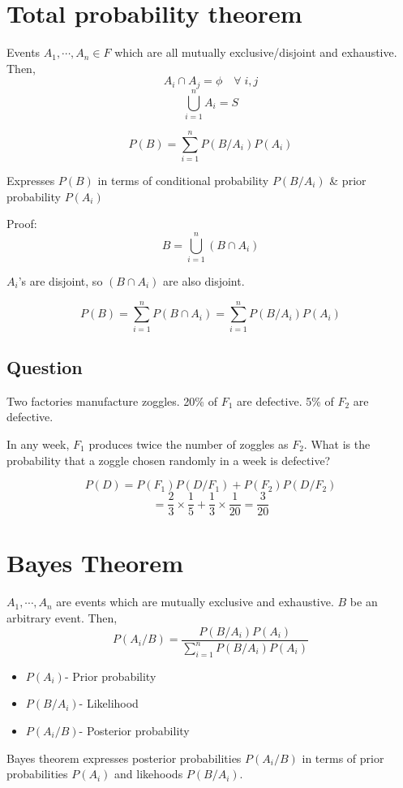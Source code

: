\documentclass{article}
\begin{document}
\section{Total probability theorem}

Events $A_1,\cdots, A_n \in F$ which are all mutually exclusive/disjoint and exhaustive. Then,
$$ A_i \cap A_j = \phi \quad \forall\; i,j$$
$$ \bigcup_{i=1}^{n} A_i =S$$

$$ P(B)= \sum_{i=1}^{n} P(B/A_i)P(A_i)$$

Expresses $ P(B)$  in terms of conditional probability $ P(B/A_i) $ \& prior probability $P(A_i)$

Proof:
$$ B= \bigcup_{i=1}^{n} (B \cap A_i)$$

$A_i$'s are disjoint, so $(B \cap A_i)$ are also disjoint.

$$ P(B)= \sum_{i=1}^{n} P(B \cap A_i)=\sum_{i=1}^{n} P(B / A_i)P(A_i)$$

\subsection{Question}
Two factories manufacture zoggles. 20\% of $F_1$ are defective. 5\% of $F_2$ are defective.

In any week, $F_1$ produces twice the number of zoggles as $F_2$. What is the probability that a zoggle chosen randomly in a week is defective?

$$ P(D)=P(F_1)P(D/F_1)+P(F_2)P(D/F_2)$$
$$ = \frac{2}{3} \times \frac{1}{5} + \frac{1}{3} \times \frac{1}{20} = \frac{3}{20}$$


\section{Bayes Theorem}
$A_1, \cdots, A_n $ are events which are mutually exclusive and exhaustive.
$B$ be an arbitrary event. Then,
$$ P(A_i/B)= \frac{P(B/A_i)P(A_i)}{\sum_{i=1}^n P(B/A_i)P(A_i)}$$

\begin{itemize}
    \item $P(A_i)$- Prior probability
    \item $P(B/A_i)$- Likelihood
    \item $P(A_i/B)$- Posterior probability
\end{itemize}

Bayes theorem expresses posterior probabilities $P(A_i/B)$ in terms of prior probabilities  $P(A_i)$ and likehoods  $P(B/A_i)$.
\end{document}
